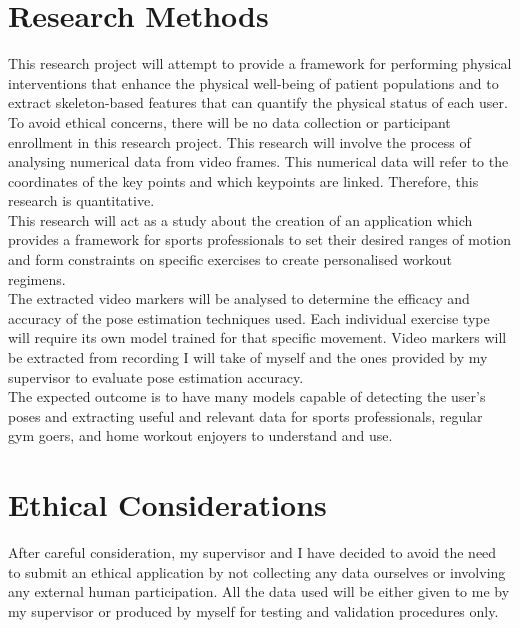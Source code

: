 \documentclass[runningheads]{llncs}
\begin{document}
\section{Research Methods} %
    This research project will attempt to provide a framework for performing physical interventions that enhance the physical well-being of patient populations and to extract skeleton-based features that can quantify the physical status of each user. To avoid ethical concerns, there will be no data collection or participant enrollment in this research project. This research will involve the process of analysing numerical data from video frames. This numerical data will refer to the coordinates of the key points and which keypoints are linked. Therefore, this research is quantitative.\\
    This research will act as a study about the creation of an application which provides a framework for sports professionals to set their desired ranges of motion and form constraints on specific exercises to create personalised workout regimens.  \\
    The extracted video markers will be analysed to determine the efficacy and accuracy of the pose estimation techniques used. Each individual exercise type will require its own model trained for that specific movement. Video markers will be extracted from recording I will take of myself and the ones provided by my supervisor to evaluate pose estimation accuracy.\\
    The expected outcome is to have many models capable of detecting the user's poses and extracting useful and relevant data for sports professionals, regular gym goers, and home workout enjoyers to understand and use.





\section{Ethical Considerations} %
    After careful consideration, my supervisor and I have decided to avoid the need to submit an ethical application by not collecting any data ourselves or involving any external human participation. All the data used will be either given to me by my supervisor or produced by myself for testing and validation procedures only.
\end{document}
